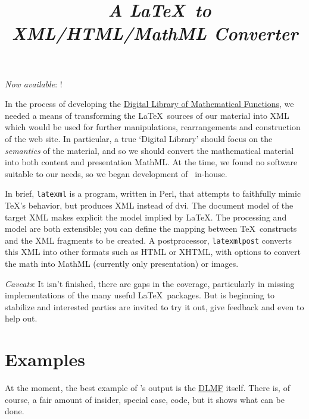 \documentclass{article}
\title{\LaTeXML\ \emph{A \LaTeX\ to XML/HTML/MathML Converter}}
\begin{document}
\label{top}
\maketitle

\emph{Now available}:  !

In the process of developing the
\href{http://dlmf.nist.gov/}{Digital Library of Mathematical Functions},
we needed a means of transforming
the \LaTeX\ sources of our material into XML which would be used
for further manipulations, rearrangements and construction of the web site.
In particular, a true `Digital Library' should focus on the \emph{semantics}
of the material, and so we should convert the mathematical material into both
content and presentation MathML.
At the time, we found no software suitable to our needs, so we began
development of \LaTeXML\ in-house.  

In brief, \texttt{latexml} is a program, written in Perl, that attempts to
faithfully mimic \TeX's behavior, but produces XML instead of dvi.
The document model of the target XML makes explicit the model implied
by \LaTeX.
The processing and model are both extensible; you can define
the mapping between \TeX\ constructs and the XML fragments to be created.
A postprocessor, \texttt{latexmlpost} converts this
XML into other formats such as HTML or XHTML, with options
to convert the math into MathML (currently only presentation) or images.

\emph{Caveats}: It isn't finished, there are gaps in the coverage,
particularly in missing implementations of the many useful \LaTeX\ packages.
But is beginning to stabilize and interested parties
are invited to try it out, give feedback and even to help out.


\section{Examples}\label{examples}
At the moment, the best example of \LaTeXML's output is 
the \href{http://dlmf.nist.gov/}{DLMF} itself.
There is, of course, a fair amount of insider, special case,
code, but it shows what can be done.
\end{document}
